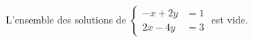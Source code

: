 L'ensemble des solutions de $\begin{cases} -x+2y &= 1 \\ 2x-4y &= 3 \end{cases}$ est vide.

\begin{reponses}
\end{reponses}


